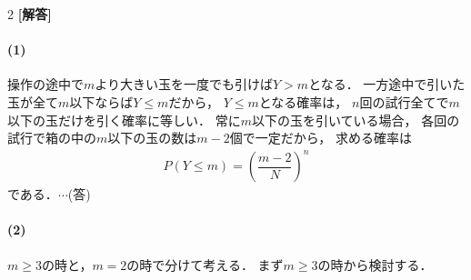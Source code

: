 \documentclass[../../main.tex]{subfiles}
\begin{document}
\setcounter{equation}{0}
\begin{oframed}
  
\end{oframed}
\setlength{\columnseprule}{0.4pt}
\begin{multicols}{2}
  {\bf [解答]}

  \paragraph{(1)}
  操作の途中で$m$より大きい玉を一度でも引けば$Y>m$となる．
  一方途中で引いた玉が全て$m$以下ならば$Y \le m$だから，
  $Y \le m$となる確率は，
  $n$回の試行全てで$m$以下の玉だけを引く確率に等しい．
  常に$m$以下の玉を引いている場合，
  各回の試行で箱の中の$m$以下の玉の数は$m-2$個で一定だから，
  求める確率は
  \begin{align}
    P(Y \le m) = \left( \dfrac{m-2}{N} \right)^n
  \end{align}
  である．$\cdots$(答)

  \paragraph{(2)}
  $m\ge 3$の時と，$ m = 2$の時で分けて考える．
  まず$m \ge 3$の時から検討する．


\end{multicols}
\end{document}
